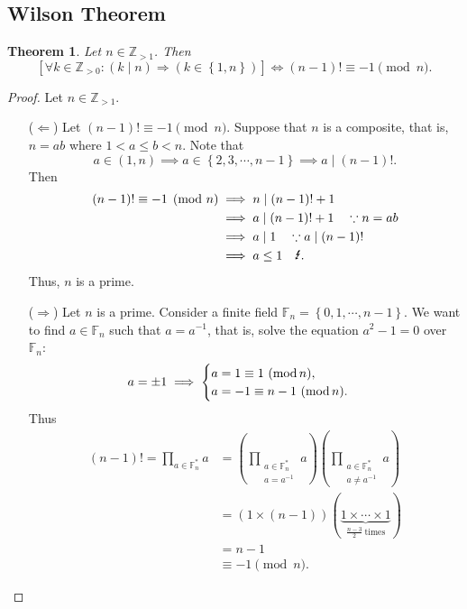 \documentclass[12pt,openany]{book}
\newtheorem{theorem}{Theorem}[chapter]
\theoremstyle{definition}
\newcommand{\set}[1]{\left\{#1\right\}}
\newcommand{\Z}{\mathbb{Z}}
\newcommand{\F}{\mathbb{F}}
\newcommand{\inv}[1]{#1^{-1}}
\newcommand{\of}[1]{\left( #1 \right)}
\newcommand{\contr}{\textup{\Lightning}}
\renewcommand{\mod}{\operatorname{\textnormal{mod}}}
\begin{document}
	\subsection{Wilson Theorem}
	
	
	\begin{tcolorbox}[colback=white,colframe=thmcolor,arc=5pt,title={\color{white}\bf Wilson Theorem}]
		\begin{theorem}
			Let $n\in\Z_{>1}$. Then \[
			\left[\forall k\in\Z_{>0
			}:(k\mid n)\Rightarrow (k\in\set{1,n})\right]\iff (n-1)!\equiv -1\pmod{n}.
			\]
		\end{theorem}
	\end{tcolorbox}
	\begin{proof}
		Let $n\in\Z_{>1}$. \begin{itemize}
			\item[($\Leftarrow$)] Let $(n-1)!\equiv -1\pmod{n}$. Suppose that $n$ is a composite, that is, $n=ab$ where $1<a\leq b<n$. Note that \[
			a\in(1,n)\implies a\in\set{2,3,\cdots, n-1}\implies a\mid (n-1)!.
			\]Then \begin{align*}
				(n-1)!\equiv -1\pmod{n}&\implies n\mid (n-1)!+1\\
				&\implies a\mid(n-1)!+1\quad\because n=ab\\
				&\implies a\mid 1\quad\because a\mid(n-1)!\\
				&\implies a\leq 1\quad\contr.
			\end{align*} Thus, $n$ is a prime.
			\item[($\Rightarrow$)] Let $n$ is a prime. Consider a finite field $\mathbb{F}_n=\set{0,1,\cdots, n-1}$. We want to find $a\in\F_{n}$ such that $a=\inv{a}$, that is, solve the equation $a^2-1=0$ over $\F_n$:
			\begin{align*}
				a=\pm 1\implies\begin{cases}
					a=1\equiv 1\ (\mod{n}),\\
					a=-1\equiv n-1\ (\mod{n}).
				\end{cases}
			\end{align*} Thus \begin{align*}
				(n-1)!=\prod_{a\in\F_n^*}a
				&=\of{\prod_{\substack{a\in\F_n^*\\ a=\inv{a}}}a}\of{\prod_{\substack{a\in\F_n^*\\ a\neq \inv{a}}}a}\\
				&=\of{1\times(n-1)}(\underbrace{1\times\cdots\times 1}_{\frac{n-3}{2}\ \text{times}})\\
				&=n-1\\
				&\equiv -1\pmod{n}.
			\end{align*}
		\end{itemize}
	\end{proof}
	
\end{document}
